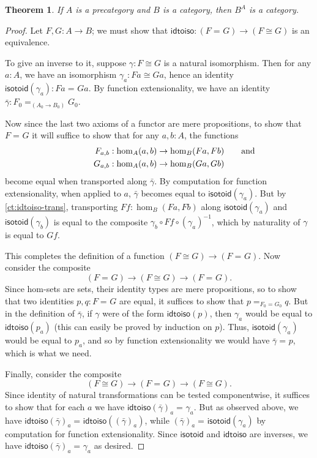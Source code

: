 \documentclass{amsart}
\newcommand{\id}[3][]{\ensuremath{#2 =_{#1} #3}\xspace}
\newtheorem{thm}{Theorem}[section]
\theoremstyle{definition}
\theoremstyle{remark}
\numberwithin{equation}{section}
\newcommand{\inv}[1]{{#1}^{-1}}
\newcommand{\idtoiso}{\ensuremath{\mathsf{idtoiso}}\xspace}
\newcommand{\isotoid}{\ensuremath{\mathsf{isotoid}}\xspace}
\begin{document}
\begin{thm}\label{ct:functor-cat}
  If $A$ is a precategory and $B$ is a category, then $B^A$ is a category.
\end{thm}
\begin{proof}
  Let $F,G:A\to B$; we must show that $\idtoiso:(\id{F}{G}) \to (F\cong G)$ is an equivalence.

  To give an inverse to it, suppose $\gamma:F\cong G$ is a natural isomorphism.
  Then for any $a:A$, we have an isomorphism $\gamma_a:Fa \cong Ga$, hence an identity $\isotoid(\gamma_a):\id{Fa}{Ga}$.
  By function extensionality, we have an identity $\bar{\gamma}:\id[(A_0\to B_0)]{F_0}{G_0}$.

  Now since the last two axioms of a functor are mere propositions, to show that $\id{F}{G}$ it will suffice to show that for any $a,b:A$, the functions
  \begin{align*}
    F_{a,b}&:\hom_A(a,b) \to \hom_B(Fa,Fb)\mathrlap{\qquad\text{and}}\\
    G_{a,b}&:\hom_A(a,b) \to \hom_B(Ga,Gb)
  \end{align*}
  become equal when transported along $\bar\gamma$.
  By computation for function extensionality, when applied to $a$, $\bar\gamma$ becomes equal to $\isotoid(\gamma_a)$.
  But by \autoref{ct:idtoiso-trans}, transporting $Ff:\hom_B(Fa,Fb)$ along $\isotoid(\gamma_a)$ and $\isotoid(\gamma_b)$ is equal to the composite $\gamma_b\circ Ff\circ \inv{(\gamma_a)}$, which by naturality of $\gamma$ is equal to $Gf$.

  This completes the definition of a function $(F\cong G) \to (\id F G)$.
  Now consider the composite
  \[ (\id F G) \to (F\cong G) \to (\id F G). \]
  Since hom-sets are sets, their identity types are mere propositions, so to show that two identities $p,q:\id F G$ are equal, it suffices to show that $\id[\id{F_0}{G_0}]{p}{q}$.
  But in the definition of $\bar\gamma$, if $\gamma$ were of the form $\idtoiso(p)$, then $\gamma_a$ would be equal to $\idtoiso(p_a)$ (this can easily be proved by induction on $p$).
  Thus, $\isotoid(\gamma_a)$ would be equal to $p_a$, and so by function extensionality we would have $\id{\bar\gamma}{p}$, which is what we need.

  Finally, consider the composite
  \[(F\cong G)\to  (\id F G) \to (F\cong G). \]
  Since identity of natural transformations can be tested componentwise, it suffices to show that for each $a$ we have $\id{\idtoiso(\bar\gamma)_a}{\gamma_a}$.
  But as observed above, we have $\id{\idtoiso(\bar\gamma)_a}{\idtoiso((\bar\gamma)_a)}$, while $\id{(\bar\gamma)_a}{\isotoid(\gamma_a)}$ by computation for function extensionality.
  Since $\isotoid$ and $\idtoiso$ are inverses, we have $\id{\idtoiso(\bar\gamma)_a}{\gamma_a}$ as desired.
\end{proof}
\end{document}
